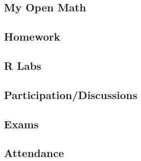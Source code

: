\documentclass[12pt]{files/handoutX}
\begin{document}
\subsection*{My Open Math}






%


\ifhw
\subsection*{Homework}
 
\fi

\subsection*{R Labs}


\subsection*{Participation/Discussions}


\subsection*{Exams}


\subsection*{Attendance}




% 



%
\end{document}
